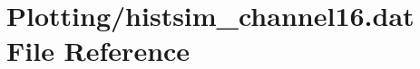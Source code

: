 \hypertarget{Plotting_2histsim__channel16_8dat}{}\section{Plotting/histsim\+\_\+channel16.dat File Reference}
\label{Plotting_2histsim__channel16_8dat}
